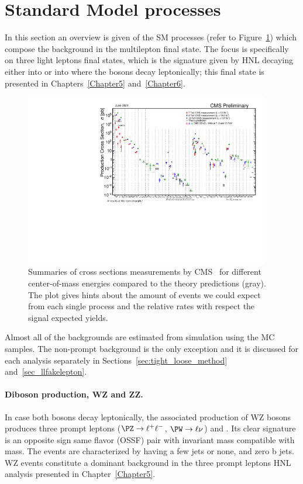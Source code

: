 \section{Standard Model processes}\label{sec:c4sm}
In this section an overview is given of the SM processes (refer to Figure~\ref{fig:crosssection}) which
compose the background in the multilepton final state. The focus is
specifically on three light leptons final states, which is the
signature given by HNL decaying either into \PZ or into \PW where the bosons
decay leptonically; this final state is presented in
Chapters~\ref{Chapter5} and~\ref{Chapter6}.
\begin{figure}[h]
\centering
  \includegraphics[width=0.95\textwidth]{Figures/c4/SigmaNew_v0.pdf}
  \caption{Summaries of cross sections measurements by CMS~\cite{cmspublic} for
    different center-of-mass energies compared to the theory
    predictions (gray). The plot gives hints about the
    amount of events we could expect from each single process and the
    relative rates with respect the signal expected yields.}
  \label{fig:crosssection}
\end{figure}

Almost all of the backgrounds are estimated from simulation using the
MC samples. The non-prompt background is the only exception and it is
discussed for each analysis separately in Sections~\ref{sec:tight_loose_method}
and~\ref{sec_llfakelepton}. 

\paragraph{Diboson production, WZ and ZZ.}\label{sec:c4wz_zz}
In case both bosons decay leptonically, the associated production of
WZ bosons produces three prompt leptons ($\PZ \rightarrow \ell^{+}
\ell^{-}$, $\PW \rightarrow \ell \nu$) and \ptmiss.
Its clear signature is an opposite sign same flavor (OSSF) pair with
invariant mass compatible with \PZ mass. The events are characterized by
having a few jets or none, and zero b jets.
WZ events
constitute a dominant background in the three prompt leptons HNL
analysis presented in Chapter~\ref{Chapter5}.

